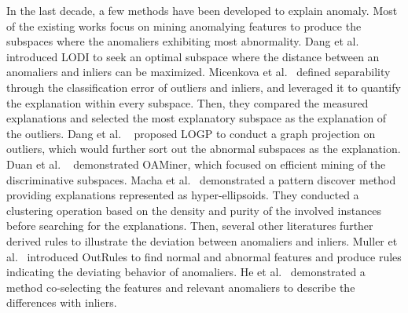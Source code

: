 In the last decade,
a few methods have been developed to explain anomaly.
Most of the existing works focus on mining anomalying features to 
produce the subspaces where 
the anomaliers exhibiting most abnormality. 
Dang et al.~\cite{dang2013local} introduced LODI to 
seek an optimal subspace where 
the distance between an anomaliers and 
inliers can be maximized. 
Micenkova et al.~\cite{micenkova2013explaining}
defined separability through the classification error of outliers and 
inliers, 
and leveraged it to 
quantify the explanation within every subspace. 
Then, 
they compared the measured explanations and 
selected the most explanatory subspace as the explanation of the outliers. 
Dang et al. ~\cite{dang2014discriminative} 
proposed LOGP to 
conduct a graph projection on outliers, 
which would further sort out the abnormal subspaces as the explanation. 
Duan et al. ~\cite{duan2015mining} 
demonstrated OAMiner, 
which focused on efficient mining of the discriminative subspaces. 
Macha et al.~\cite{macha2018explaining} 
demonstrated a pattern discover method providing explanations represented as hyper-ellipsoids. 
They conducted a clustering operation based on the density and 
purity of the involved instances before searching for the explanations. 
Then, 
several other literatures further derived rules to 
illustrate the deviation between anomaliers and 
inliers. 
Muller et al.~\cite{muller2012outrules} 
introduced OutRules to 
find normal and abnormal features and 
produce rules indicating the deviating behavior of anomaliers. 
He et al.~\cite{he2010co} 
demonstrated a method co-selecting the features and 
relevant anomaliers to 
describe the differences with inliers. 


